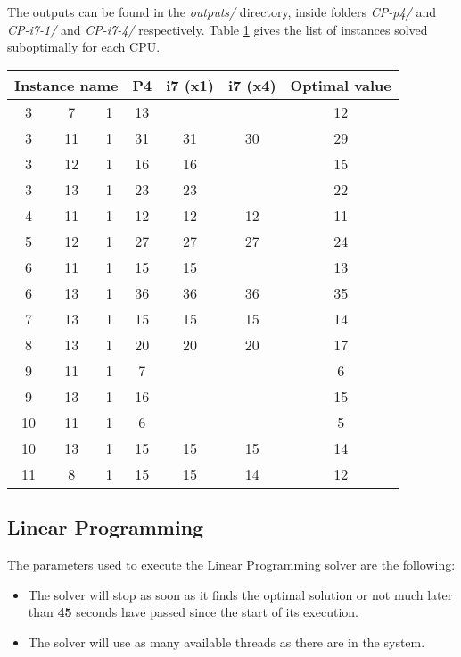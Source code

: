 The outputs can be found in the \textit{outputs/} directory, inside folders
\textit{CP-p4/} and \textit{CP-i7-1/} and \textit{CP-i7-4/} respectively.
Table \ref{table:CP-results:suboptimalinstances} gives the list of instances
solved suboptimally for each CPU.

\begin{table}[H]
\centering
	\begin{tabular}{ccccccc}
		\multicolumn{3}{c}{Instance name}
					& P4		& i7 (x1)	& i7 (x4)	& Optimal value \\
		\midrule
		 3 &  7 & 1	& 13		&  			&  			& 12 \\
		 3 & 11 & 1	& 31		&  31		& 30			& 29 \\
		 3 & 12 & 1	& 16		&  16		&  			& 15 \\
		 3 & 13 & 1	& 23		&  23		&  			& 22 \\
		 4 & 11 & 1	& 12		&  12		& 12			& 11 \\
		 5 & 12 & 1	& 27		&  27		& 27			& 24 \\
		 6 & 11 & 1	& 15		&  15		&  			& 13 \\
		 6 & 13 & 1	& 36		&  36		& 36			& 35 \\
		 7 & 13 & 1	& 15		&  15		& 15			& 14 \\
		 8 & 13 & 1	& 20		&  20		& 20			& 17 \\
		 9 & 11 & 1	&  7		&   			&  			&  6 \\
		 9 & 13 & 1	& 16		&   			&  			& 15 \\
		10 & 11 & 1	&  6		&   			&  			&  5 \\
		10 & 13 & 1	& 15		&  15		& 15			& 14 \\
		11 &  8 & 1	& 15		&  15		& 14			& 12 \\
	\end{tabular}
	\label{table:CP-results:suboptimalinstances}
\end{table}

\subsection{Linear Programming}
\label{sec:benchmarking:linear-programming}

The parameters used to execute the Linear Programming solver are the following:
\begin{itemize}
	\item The solver will stop as soon as it finds the optimal solution or not much
	later than \textbf{45} seconds have passed since the start of its execution.
	\item The solver will use as many available threads as there are in the system.
\end{itemize}

